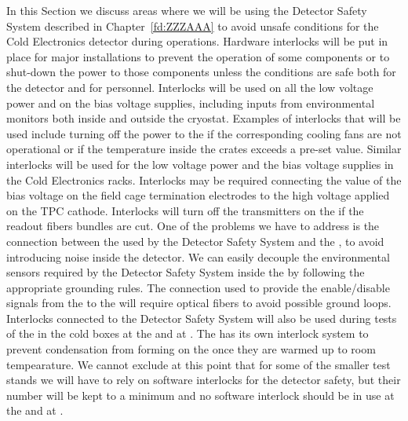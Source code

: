 In this Section we discuss areas where we will be using
the Detector Safety System described in Chapter~\ref{fd:ZZZAAA}
to avoid unsafe conditions for the Cold Electronics detector 
during operations. Hardware interlocks will be put in place
for major installations to prevent the operation of some 
components or to shut-down the power to those components 
unless the conditions are safe
both for the detector and for personnel. Interlocks will be
used on all the low voltage power and on the bias voltage 
supplies, including inputs from environmental monitors both
inside and outside the cryostat. Examples of interlocks that
will be used include turning off the power to the 
if the corresponding cooling fans are not operational or
if the temperature inside the crates exceeds a pre-set value.
Similar interlocks will be used for the low voltage power
and the bias voltage supplies in the Cold Electronics racks.
Interlocks may be required connecting the value of the 
bias voltage on the field cage termination electrodes to the
high voltage applied on the TPC cathode. Interlocks will turn 
off the transmitters on the  if the readout fibers 
bundles are cut. One of the problems we have to address is 
the connection between the  used by the Detector 
Safety System and the , to avoid introducing noise 
inside the detector. We can easily decouple the environmental 
sensors required by the Detector Safety System inside the 
 by following the appropriate grounding rules. 
The connection used to provide the enable/disable signals 
from the  to the  will require optical 
fibers to avoid possible ground loops. Interlocks connected
to the Detector Safety System will also be used during tests 
of the  in the cold boxes at the  and 
at \surf. The  has its own interlock system to
prevent condensation from forming on the  once
they are warmed up to room tempearature. We cannot exclude at
this point that for some of the smaller test stands we will 
have to rely on software interlocks for the detector safety,
but their number will be kept to a minimum and no software
interlock should be in use at the  and at \surf.
